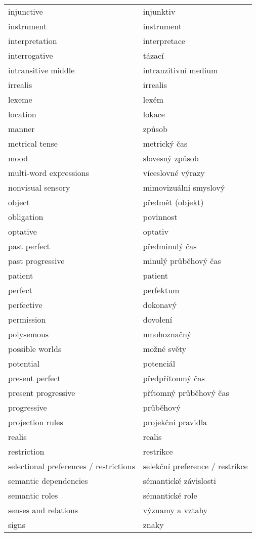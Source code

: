 \documentclass[a4paper,landscape,headrule,footrule,xetex]{foils}
\begin{document}
\begin{longtable}{ll}
 injunctive & injunktiv \\
 instrument & instrument \\
 interpretation & interpretace \\
 interrogative & tázací \\
 intransitive middle & intranzitivní medium \\
 irrealis & irrealis \\
 lexeme & lexém \\
 location & lokace \\
 manner & způsob \\
 metrical tense & metrický čas \\
 mood & slovesný způsob \\
 multi-word expressions & víceslovné výrazy \\
 nonvisual sensory & mimovizuální smyslový \\
 object & předmět (objekt) \\
 obligation & povinnost \\
 optative & optativ \\
 past perfect & předminulý čas \\
 past progressive & minulý průběhový čas \\
 patient & patient \\
 perfect & perfektum \\
 perfective & dokonavý \\
 permission & dovolení \\
 polysemous & mnohoznačný \\
 possible worlds & možné světy \\
 potential & potenciál \\
 present perfect & předpřítomný čas \\
 present progressive & přítomný průběhový čas \\
 progressive & průběhový \\
 projection rules & projekční pravidla \\
 realis & realis \\
 restriction & restrikce \\
 selectional preferences / restrictions & selekční preference / restrikce \\
 semantic dependencies & sémantické závislosti \\
 semantic roles & sémantické role \\
 senses and relations & významy a vztahy \\
 signs & znaky \\

\end{longtable}
\end{document}

